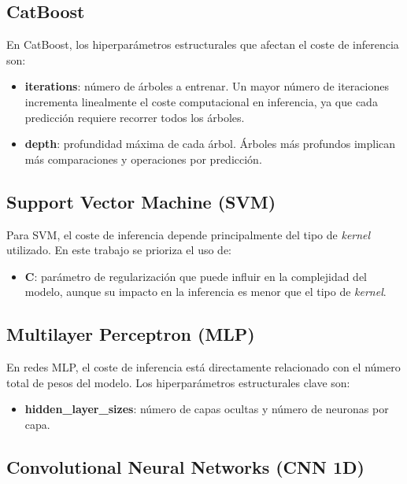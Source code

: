 \subsection{CatBoost}

En CatBoost, los hiperparámetros estructurales que afectan el coste de inferencia son:

\begin{itemize}
    \item \textbf{iterations}: número de árboles a entrenar. Un mayor número de iteraciones incrementa linealmente el coste computacional en inferencia, ya que cada predicción requiere recorrer todos los árboles.
    \item \textbf{depth}: profundidad máxima de cada árbol. Árboles más profundos implican más comparaciones y operaciones por predicción.
\end{itemize}


\subsection{Support Vector Machine (SVM)}

Para SVM, el coste de inferencia depende principalmente del tipo de \textit{kernel} utilizado. En este trabajo se prioriza el uso de:

\begin{itemize}
    \item \textbf{C}: parámetro de regularización que puede influir en la complejidad del modelo, aunque su impacto en la inferencia es menor que el tipo de \textit{kernel}.
\end{itemize}

\subsection{Multilayer Perceptron (MLP)}

En redes MLP, el coste de inferencia está directamente relacionado con el número total de pesos del modelo. Los hiperparámetros estructurales clave son:

\begin{itemize}
    \item \textbf{hidden\_layer\_sizes}: número de capas ocultas y número de neuronas por capa.
\end{itemize}

\subsection{Convolutional Neural Networks (CNN 1D)}

